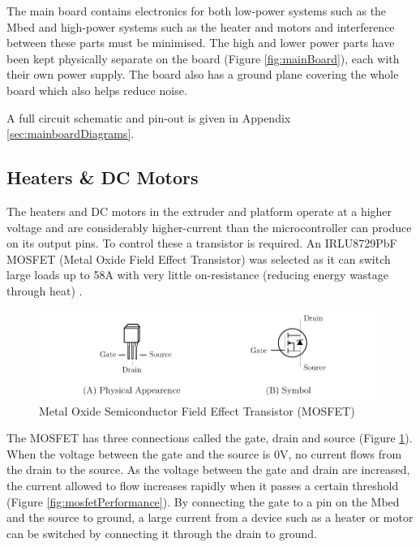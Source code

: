 			The main board contains electronics for both low-power systems such as
			the Mbed and high-power systems such as the heater and motors and
			interference between these parts must be minimised. The high and lower
			power parts have been kept physically separate on the board (Figure
			\ref{fig:mainBoard}), each with their own power supply. The board also
			has a ground plane covering the whole board which also helps reduce
			noise\cite{pcb_design_notes}.
			
			A full circuit schematic and pin-out is given in Appendix
			\ref{sec:mainboardDiagrams}.
		
		\subsection{Heaters \& DC Motors}
			
			\label{sec:heatersAndMotors}
			
			The heaters and DC motors in the extruder and platform operate at a
			higher voltage and are considerably higher-current than the
			microcontroller can produce on its output pins. To control these a
			transistor is required.  An IRLU8729PbF MOSFET (Metal Oxide Field Effect
			Transistor) was selected as it can switch large loads up to 58A with
			very little on-resistance (reducing energy wastage through
			heat) \cite{MOSFET}.
			
			\begin{figure}
				\includegraphics[width=1\textwidth]{diagrams/mosfetDiagram.pdf}
				\caption{Metal Oxide Semiconductor Field Effect Transistor (MOSFET)}
				\label{fig:mosfetDiagram}
			\end{figure}
			
			The MOSFET has three connections called the gate, drain and source
			(Figure \ref{fig:mosfetDiagram}). When the voltage between the gate and
			the source is 0V, no current flows from the drain to the source. As the
			voltage between the gate and drain are increased, the current allowed to
			flow increases rapidly when it passes a certain threshold (Figure
			\ref{fig:mosfetPerformance}). By connecting the gate to a pin on the
			Mbed and the source to ground, a large current from a device such as a
			heater or motor can be switched by connecting it through the drain to
			ground.
			
